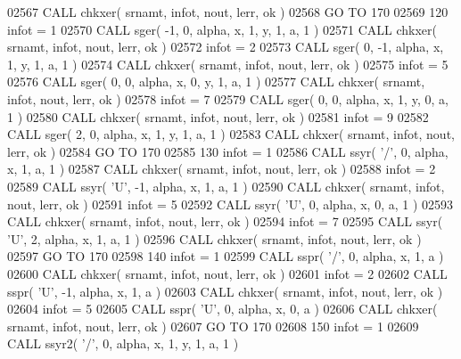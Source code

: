 \begin{DoxyCode}
02567       \textcolor{keyword}{CALL }chkxer( srnamt, infot, nout, lerr, ok )
02568       \textcolor{keywordflow}{GO TO} 170
02569   120 infot = 1
02570       \textcolor{keyword}{CALL }sger( -1, 0, alpha, x, 1, y, 1, a, 1 )
02571       \textcolor{keyword}{CALL }chkxer( srnamt, infot, nout, lerr, ok )
02572       infot = 2
02573       \textcolor{keyword}{CALL }sger( 0, -1, alpha, x, 1, y, 1, a, 1 )
02574       \textcolor{keyword}{CALL }chkxer( srnamt, infot, nout, lerr, ok )
02575       infot = 5
02576       \textcolor{keyword}{CALL }sger( 0, 0, alpha, x, 0, y, 1, a, 1 )
02577       \textcolor{keyword}{CALL }chkxer( srnamt, infot, nout, lerr, ok )
02578       infot = 7
02579       \textcolor{keyword}{CALL }sger( 0, 0, alpha, x, 1, y, 0, a, 1 )
02580       \textcolor{keyword}{CALL }chkxer( srnamt, infot, nout, lerr, ok )
02581       infot = 9
02582       \textcolor{keyword}{CALL }sger( 2, 0, alpha, x, 1, y, 1, a, 1 )
02583       \textcolor{keyword}{CALL }chkxer( srnamt, infot, nout, lerr, ok )
02584       \textcolor{keywordflow}{GO TO} 170
02585   130 infot = 1
02586       \textcolor{keyword}{CALL }ssyr( \textcolor{stringliteral}{'/'}, 0, alpha, x, 1, a, 1 )
02587       \textcolor{keyword}{CALL }chkxer( srnamt, infot, nout, lerr, ok )
02588       infot = 2
02589       \textcolor{keyword}{CALL }ssyr( \textcolor{stringliteral}{'U'}, -1, alpha, x, 1, a, 1 )
02590       \textcolor{keyword}{CALL }chkxer( srnamt, infot, nout, lerr, ok )
02591       infot = 5
02592       \textcolor{keyword}{CALL }ssyr( \textcolor{stringliteral}{'U'}, 0, alpha, x, 0, a, 1 )
02593       \textcolor{keyword}{CALL }chkxer( srnamt, infot, nout, lerr, ok )
02594       infot = 7
02595       \textcolor{keyword}{CALL }ssyr( \textcolor{stringliteral}{'U'}, 2, alpha, x, 1, a, 1 )
02596       \textcolor{keyword}{CALL }chkxer( srnamt, infot, nout, lerr, ok )
02597       \textcolor{keywordflow}{GO TO} 170
02598   140 infot = 1
02599       \textcolor{keyword}{CALL }sspr( \textcolor{stringliteral}{'/'}, 0, alpha, x, 1, a )
02600       \textcolor{keyword}{CALL }chkxer( srnamt, infot, nout, lerr, ok )
02601       infot = 2
02602       \textcolor{keyword}{CALL }sspr( \textcolor{stringliteral}{'U'}, -1, alpha, x, 1, a )
02603       \textcolor{keyword}{CALL }chkxer( srnamt, infot, nout, lerr, ok )
02604       infot = 5
02605       \textcolor{keyword}{CALL }sspr( \textcolor{stringliteral}{'U'}, 0, alpha, x, 0, a )
02606       \textcolor{keyword}{CALL }chkxer( srnamt, infot, nout, lerr, ok )
02607       \textcolor{keywordflow}{GO TO} 170
02608   150 infot = 1
02609       \textcolor{keyword}{CALL }ssyr2( \textcolor{stringliteral}{'/'}, 0, alpha, x, 1, y, 1, a, 1 )

\end{DoxyCode}
